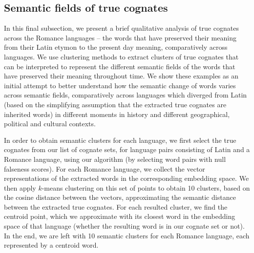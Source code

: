 \documentclass[output=paper]{langsci/langscibook}
\begin{document}
\subsection{Semantic fields of true cognates}

In this final subsection, we present a brief qualitative analysis of true cognates across the Romance languages -- the words that have preserved their meaning from their Latin etymon to the present day meaning, comparatively across languages. We use clustering methods to extract clusters of true cognates that can be interpreted to represent the different semantic fields of the words that have preserved their meaning throughout time. We show these examples as an initial attempt to better understand how the semantic change of words varies across semantic fields, comparatively across languages which diverged from Latin (based on the simplifying assumption that the extracted true cognates are inherited words) in different moments in history and different geographical, political and cultural contexts.   

In order to obtain semantic clusters for each language, we first select the true cognates from our list of cognate sets, for language pairs consisting of Latin and a Romance language, using our algorithm (by selecting word pairs with null falseness scores). For each Romance language, we collect the vector representations of the extracted words in the corresponding embedding space. We then apply $k$-means clustering on this set of points to obtain 10 clusters, based on the cosine distance between the vectors, approximating the semantic distance between the extracted true cognates. For each resulted cluster, we find the centroid point, which we approximate with its closest word in the embedding space of that language (whether the resulting word is in our cognate set or not). In the end, we are left with 10 semantic clusters for each Romance language, each represented by a centroid word. 

\end{document}
